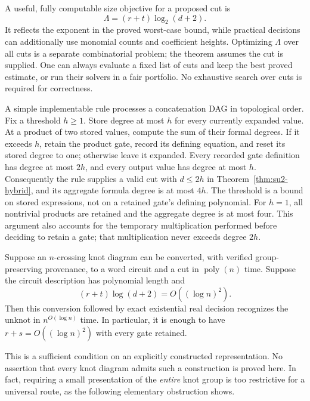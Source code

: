 A useful, fully computable size objective for a proposed cut is
\[
 \Lambda=(r+t)\log_2(d+2).
\]
It reflects the exponent in the proved worst-case bound, while practical
decisions can additionally use monomial counts and coefficient heights.
Optimizing $\Lambda$ over all cuts is a separate combinatorial problem;
the theorem assumes the cut is supplied.  One can always evaluate a fixed
list of cuts and keep the best proved estimate, or run their solvers in a
fair portfolio.  No exhaustive search over cuts is required for correctness.

\begin{remark}
A simple implementable rule processes a concatenation DAG in topological
order.  Fix a threshold $h\geq1$.  Store degree at most $h$ for every
currently expanded value.  At a product of two stored values, compute the
sum of their formal degrees.  If it exceeds $h$, retain the product gate,
record its defining equation, and reset its stored degree to one;
otherwise leave it expanded.  Every recorded gate definition has degree
at most $2h$, and every output value has degree at most $h$.  Consequently
the rule supplies a valid cut with $d\leq2h$ in
Theorem~\ref{thm:su2-hybrid}, and its aggregate formula degree is at
most $4h$.  The threshold is a bound on stored expressions, not on a
retained gate's defining polynomial.  For $h=1$, all nontrivial products
are retained and the aggregate degree is at most four.  This argument
also accounts for the temporary multiplication performed before deciding
to retain a gate; that multiplication never exceeds degree $2h$.
\end{remark}

\begin{corollary}
\label{cor:su2-qp-condition}
Suppose an $n$-crossing knot diagram can be converted, with verified
group-preserving provenance, to a word circuit and a cut in
$\operatorname{poly}(n)$ time.  Suppose the circuit description has
polynomial length and
\[
 (r+t)\log(d+2)=O((\log n)^2).
\]
Then this conversion followed by exact existential real decision recognizes
the unknot in $n^{O(\log n)}$ time.  In particular, it is enough to have
$r+s=O((\log n)^2)$ with every gate retained.
\end{corollary}

This is a sufficient condition on an explicitly constructed representation.
No assertion that every knot diagram admits such a construction is proved
here.  In fact, requiring a small presentation of the \emph{entire} knot
group is too restrictive for a universal route, as the following elementary
obstruction shows.


